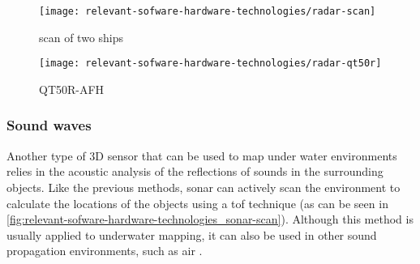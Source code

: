 \begin{savenotes}
\begin{figure}[H]
	\centering
	\begin{minipage}[h]{.47\textwidth}
		\centering
		\texttt{[image: relevant-sofware-hardware-technologies/radar-scan]}
		\caption[ scan of two ships]{ scan of two ships\protect\footnotemark}
		\label{fig:relevant-sofware-hardware-technologies_radar-scan}
	\end{minipage}\hfill
	\begin{minipage}[h]{.47\textwidth}
		\centering
		\texttt{[image: relevant-sofware-hardware-technologies/radar-qt50r]}
		\caption[QT50R-AFH ]{QT50R-AFH \protect\footnotemark}
		\label{fig:relevant-sofware-hardware-technologies_radar-qt50r}
	\end{minipage}
\end{figure}
\end{savenotes}



\subsubsection{Sound waves}

Another type of 3D sensor that can be used to map under water environments relies in the acoustic analysis of the reflections of sounds in the surrounding objects. Like the previous methods, \gls{sonar} can actively scan the environment to calculate the locations of the objects using a \gls{tof} technique (as can be seen in \cref{fig:relevant-sofware-hardware-technologies_sonar-scan}). Although this method is usually applied to underwater mapping, it can also be used in other sound propagation environments, such as air \cite{Guarato2013}.

